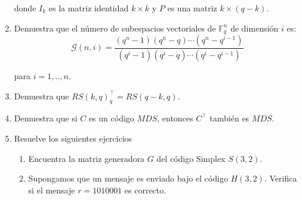 \documentclass[letterpaper,10pt]{article}
\begin{document}
\begin{enumerate}
    donde $I_{k}$ es la matriz identidad $k \times k$ y $P$ es una matriz 
    $k \times (q-k)$. 
    
    \item Demuestra que el número de subespacios vectoriales de 
    $\mathbb{F}^{n}_{q}$ de dimensión $i$ es: 
    \begin{equation}
        \mathcal{G}(n, i) = \frac{(q^{n}-1)(q^{n}-q)\cdots(q^{n}-q^{i-1})}
        {(q^{i}-1)(q^{i}-q)\cdots(q^{i}-q^{i-1})}
    \end{equation}
    
    para $i = 1,.., n$.
    
    \item Demuestra que $RS(k, q)^{\top}_{q} = RS(q-k, q)$.
    
    \item Demuestra que si $C$ es un código $MDS$, entonces $C^{\top}$ también
    es $MDS$. 
    
    \item Resuelve los siguientes ejercicios
    \begin{enumerate}
        \item Encuentra la matriz generadora $G$ del código Simplex $S(3,2)$.
        \item Supongamos que un mensaje es enviado bajo el código $H(3,2)$.
        Verifica si el mensaje $r = 1010001$ es correcto. 
    \end{enumerate}


\end{enumerate}
\end{document}
